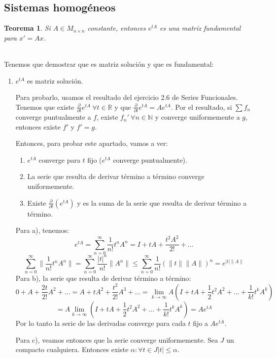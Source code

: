 \documentclass{article}
\makeatletter
\providecommand{\norm}[1]{\lVert#1\rVert}
\providecommand{\abs}[1]{\lvert#1\rvert}
\theoremstyle{theorem-style}  %
\newtheorem{theorem}{Teorema}[section]  %
\theoremstyle{definition-style}
\theoremstyle{example-style}
\renewenvironment{proof}[1][\proofname]{\par
	\pushQED{\qed}%
	\normalfont \topsep6\p@\@plus6\p@\relax
	\list{}{%
		\settowidth{\leftmargin}{\quad:\hskip\labelsep}%
		\setlength{\labelwidth}{0pt}%
		\setlength{\itemindent}{-\leftmargin}%
	}%
	\item[\hskip\labelsep\itshape#1\@addpunct{:}]\ignorespaces
}{%
	\popQED\endlist\@endpefalse
}
\makeatother
\begin{document}
\subsection{Sistemas homogéneos}
\begin{theorem}
	Si $ A\in M_{n\times n} $ constante, entonces $ e^{tA} $ es una matriz fundamental para $ x'=Ax $.
\end{theorem}
\begin{proof} \ \\
	Tenemos que demostrar que es matriz solución y que es fundamental:
	\begin{enumerate}[\quad i)]
		\item $ e^{tA} $ es matriz solución. 
		
		Para probarlo, usamos el resultado del ejercicio 2.6 de Series Funcionales. Tenemos que existe $ \frac{\partial}{\partial t}e^{tA} \ \forall t \in \mathbb{R} $ y que $ \frac{\partial}{\partial t}e^{tA}=Ae^{tA} $. Por el resultado, si $ \sum f_n $ converge puntualmente a $ f $, existe $ f_n'\ \forall n \in \mathbb{N} $ y converge uniformemente a $ g $, entonces existe $ f' $ y $ f'=g $.
		
		Entonces, para probar este apartado, vamos a ver:
		\begin{enumerate}[\quad a)]
			\item $ e^{tA} $ converge para $ t $ fijo ($ e^{tA} $ converge puntualmente).
			\item La serie que resulta de derivar término a término converge uniformemente.
			\item Existe $ \frac{\partial}{\partial t} (e^{tA}) $ y es la suma de la serie que resulta de derivar término a término.
		\end{enumerate}
		Para a), tenemos:
		\[ e^{tA}=\sum_{n=0}^{\infty} \frac{1}{n!}t^nA^n=I+tA+\frac{t^2A^2}{2!}+\dots \]
		\[ \sum_{n=0}^{\infty} \norm{\frac{1}{n!}t^nA^n}=\sum_{n=0}^{\infty} \frac{\abs{t}^n}{n!}\norm{A^n}\leq \sum_{n=0}^{\infty} \frac{1}{n!}(\norm{t}\norm{A})^n = e^{\abs{t}\norm{A}}\]
		Para b), la serie que resulta de derivar término a término:
		\[ 0+A+ \frac{2t}{2!}A^2+\dots =A+tA^2+\frac{t^2}{2!}A^3+\dots =\lim\limits_{k\to\infty} A(I+tA+\frac{1}{2}t^2A^2+\dots+\frac{1}{k!}t^kA^k)
		\]
		\[=A\lim\limits_{k\to\infty} (I+tA+\frac{1}{2}t^2A^2+\dots+\frac{1}{k!}t^kA^k) = Ae^{tA} \]
		Por lo tanto la serie de las derivadas converge para cada $ t $ fijo a $ Ae^{tA} $.
		
		Para c), veamos entonces que la serie converge uniformemente. Sea $ J $ un compacto cualquiera. Entonces existe $ \alpha : \forall t \in J \abs{t}\leq \alpha$.
		

\end{enumerate}
\end{proof}
\end{document}

